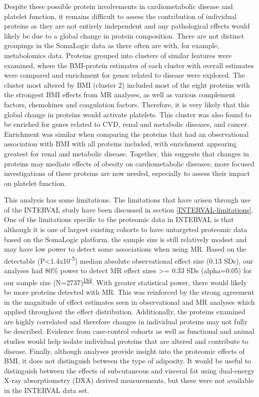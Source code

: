 \documentclass[11pt,twoside]{bristolthesis}
\begin{document}
Despite these possible protein involvements in cardiometabolic disease and platelet function, it remains difficult to assess the contribution of individual proteins as they are not entirely independent and any pathological effects would likely be due to a global change in protein composition. There are not distinct groupings in the SomaLogic data as there often are with, for example, metabolomics data. Proteins grouped into clusters of similar features were examined, where the BMI-protein estimates of each cluster with overall estimates were compared and enrichment for genes related to disease were explored. The cluster most altered by BMI (cluster 2) included most of the eight proteins with the strongest BMI effects from MR analyses, as well as various complement factors, chemokines and coagulation factors. Therefore, it is very likely that this global change in proteins would activate platelets. This cluster was also found to be enriched for genes related to CVD, renal and metabolic diseases, and cancer. Enrichment was similar when comparing the proteins that had an observational association with BMI with all proteins included, with enrichment appearing greatest for renal and metabolic disease. Together, this suggests that changes in proteins may mediate effects of obesity on cardiometabolic diseases; more focused investigations of these proteins are now needed, especially to assess their impact on platelet function.

This analysis has some limitations. The limitations that have arisen through use of the INTERVAL study have been discussed in section \ref{INTERVAL-limitations}. One of the limitations specific to the proteomic data in INTERVAL is that although it is one of largest existing cohorts to have untargeted proteomic data based on the SomaLogic platform, the sample size is still relatively modest and may have low power to detect some associations when using MR. Based on the detectable (P\textless1.4x10\textsuperscript{-5}) median absolute observational effect size (0.13 SDs), our analyses had 80\% power to detect MR effect sizes \textgreater= 0.33 SDs (alpha=0.05) for our sample size (N=2737)\textsuperscript{\protect\hyperlink{ref-Brion2013}{184}}. With greater statistical power, there would likely be more proteins detected with MR. This was reinforced by the strong agreement in the magnitude of effect estimates seen in observational and MR analyses which applied throughout the effect distribution. Additionally, the proteins examined are highly correlated and therefore changes in individual proteins may not fully be described. Evidence from case-control cohorts as well as functional and animal studies would help isolate individual proteins that are altered and contribute to disease. Finally, although analyses provide insight into the proteomic effects of BMI, it does not distinguish between the type of adiposity. It would be useful to distinguish between the effects of subcutaneous and visceral fat using dual-energy X-ray absorptiometry (DXA) derived measurements, but these were not available in the INTERVAL data set.
\end{document}
